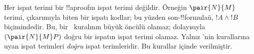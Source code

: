 Her ispat terimi bir !!a{proof}{}ın ispat terimi değildir. Örneğin
$\pair{N}{M}$ terimi, \Intro{\land} çıkarımıyla biten bir ispatı kodlar;
bu yüzden son-!!{formula}{}ü, $!A \land !B$ biçimindedir. Bu,
bir~\Elim{\lif} kuralının büyük öncülü olamaz; dolayısıyla
$(\pair{N}{M}P)$ doğru bir ispatın ispat terimi olamaz. Yalnız
'nin kurallarına uyan ispat terimleri \emph{doğru} ispat
terimleridir. Bu kurallar  içinde verilmiştir.


